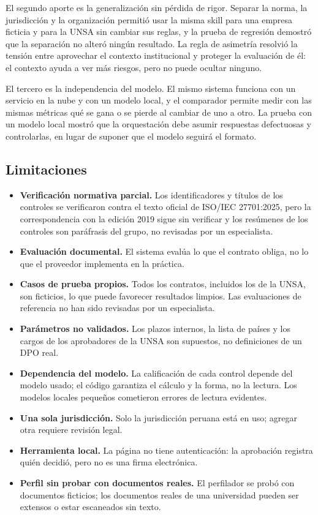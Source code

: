 \documentclass[12pt,letterpaper]{article}
\begin{document}
El segundo aporte es la generalización sin pérdida de rigor. Separar la norma, la jurisdicción y la organización permitió usar la misma skill para una empresa ficticia y para la UNSA sin cambiar sus reglas, y la prueba de regresión demostró que la separación no alteró ningún resultado. La regla de asimetría resolvió la tensión entre aprovechar el contexto institucional y proteger la evaluación de él: el contexto ayuda a ver más riesgos, pero no puede ocultar ninguno.

El tercero es la independencia del modelo. El mismo sistema funciona con un servicio en la nube y con un modelo local, y el comparador permite medir con las mismas métricas qué se gana o se pierde al cambiar de uno a otro. La prueba con un modelo local mostró que la orquestación debe asumir respuestas defectuosas y controlarlas, en lugar de suponer que el modelo seguirá el formato.

\subsection{Limitaciones}

\begin{itemize}
  \item \textbf{Verificación normativa parcial.} Los identificadores y títulos de los controles se verificaron contra el texto oficial de ISO/IEC 27701:2025, pero la correspondencia con la edición 2019 sigue sin verificar y los resúmenes de los controles son paráfrasis del grupo, no revisadas por un especialista.
  \item \textbf{Evaluación documental.} El sistema evalúa lo que el contrato obliga, no lo que el proveedor implementa en la práctica.
  \item \textbf{Casos de prueba propios.} Todos los contratos, incluidos los de la UNSA, son ficticios, lo que puede favorecer resultados limpios. Las evaluaciones de referencia no han sido revisadas por un especialista.
  \item \textbf{Parámetros no validados.} Los plazos internos, la lista de países y los cargos de los aprobadores de la UNSA son supuestos, no definiciones de un DPO real.
  \item \textbf{Dependencia del modelo.} La calificación de cada control depende del modelo usado; el código garantiza el cálculo y la forma, no la lectura. Los modelos locales pequeños cometieron errores de lectura evidentes.
  \item \textbf{Una sola jurisdicción.} Solo la jurisdicción peruana está en uso; agregar otra requiere revisión legal.
  \item \textbf{Herramienta local.} La página no tiene autenticación: la aprobación registra quién decidió, pero no es una firma electrónica.
  \item \textbf{Perfil sin probar con documentos reales.} El perfilador se probó con documentos ficticios; los documentos reales de una universidad pueden ser extensos o estar escaneados sin texto.
\end{itemize}
\end{document}
